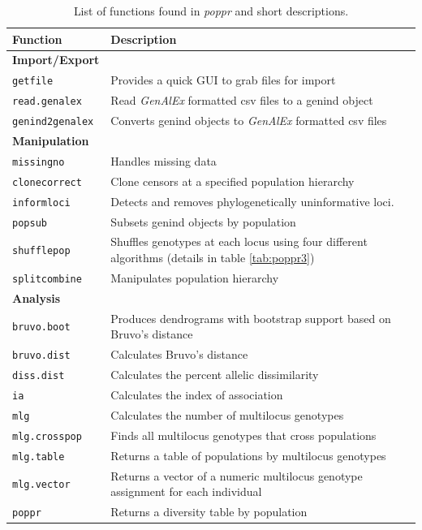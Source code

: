 \documentclass[double,11pt]{beavtex}
\begin{document}
  \begin{table}
  \caption{List of functions found in \textit{poppr} and short descriptions.}
  \label{tab:poppr1}
  \begin{tabular}{ll}
  \hline
  Function & Description \\ 
  \hline
  \textbf{Import/Export} & \\
  \texttt{getfile} & Provides a quick GUI to grab files for import \\
  \texttt{read.genalex} & Read \textit{GenAlEx} formatted csv files to a genind object \\
  \texttt{genind2genalex} & Converts genind objects to \textit{GenAlEx} formatted csv files \\
  \hline
  \textbf{Manipulation} & \\
  \texttt{missingno} & Handles missing data \\
  \texttt{clonecorrect} & Clone censors at a specified population hierarchy \\
  \texttt{informloci} & Detects and removes phylogenetically uninformative loci. \\
  \texttt{popsub} & Subsets genind objects by population \\
  \texttt{shufflepop} & Shuffles genotypes at each locus using four different algorithms (details in table \ref{tab:poppr3}) \\
  \texttt{splitcombine} & Manipulates population hierarchy \\ 
  \hline
  \textbf{Analysis} & \\
  \texttt{bruvo.boot} & Produces dendrograms with bootstrap support based on Bruvo's distance \\
  \texttt{bruvo.dist} & Calculates Bruvo's distance \\
  \texttt{diss.dist} & Calculates the percent allelic dissimilarity \\
  \texttt{ia} & Calculates the index of association \\
  \texttt{mlg} & Calculates the number of multilocus genotypes \\
  \texttt{mlg.crosspop} & Finds all multilocus genotypes that cross populations \\
  \texttt{mlg.table} & Returns a table of populations by multilocus genotypes \\
  \texttt{mlg.vector} & Returns a vector of a numeric multilocus genotype assignment for each individual \\
  \texttt{poppr} & Returns a diversity table by population \\

\end{tabular}
\end{table}
\end{document}
